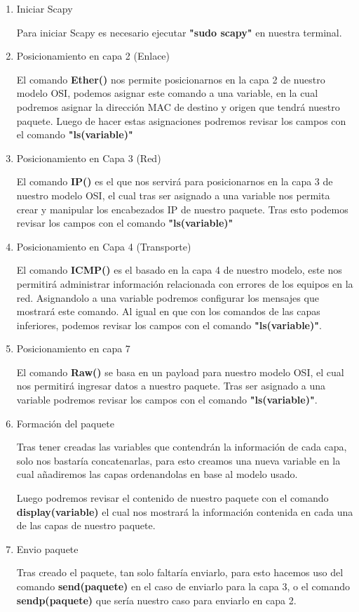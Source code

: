 \documentclass[spanish]{udpreport}
\begin{document}
\begin{enumerate}
	\item Iniciar Scapy
    	\par Para iniciar Scapy es necesario ejecutar \textbf{"sudo scapy"} en nuestra terminal.
    \item Posicionamiento en capa 2 (Enlace)
        \par El comando \textbf{Ether()} nos permite posicionarnos en la capa 2 de nuestro modelo OSI, podemos asignar este comando a una variable, en la cual podremos asignar la dirección MAC de destino y origen que tendrá nuestro paquete. Luego de hacer estas asignaciones podremos revisar los campos con el comando \textbf{"ls(variable)"} 
       \item Posicionamiento en Capa 3 (Red)
       	\par El comando \textbf{IP()} es el que nos servirá para posicionarnos en la capa 3 de nuestro modelo OSI, el cual tras ser asignado a una variable nos permita crear y manipular los encabezados IP de nuestro paquete. Tras esto podemos revisar los campos  con el comando \textbf{"ls(variable)"} 
       \item Posicionamiento en Capa 4 (Transporte)
       	\par El comando \textbf{ICMP()} es el basado en la capa 4 de nuestro modelo, este nos permitirá administrar información relacionada con errores de los equipos en la red. Asignandolo a una variable podremos configurar los mensajes que mostrará este comando. Al igual en que con los comandos de las capas inferiores, podemos revisar los campos con el comando \textbf{"ls(variable)"}.
       \item Posicionamiento en capa 7
       	\par El comando \textbf{Raw()} se basa en un payload para nuestro modelo OSI, el cual nos permitirá ingresar datos a nuestro paquete. Tras ser asignado a una variable podremos revisar los campos con el comando \textbf{"ls(variable)"}.
       \item Formación del paquete
       	\par Tras tener creadas las variables que contendrán la información de cada capa, solo nos bastaría concatenarlas, para esto creamos una nueva variable en la cual añadiremos las capas ordenandolas en base al modelo usado.
        \par Luego podremos revisar el contenido de nuestro paquete con el comando \textbf{display(variable)} el cual nos mostrará la información contenida en cada una de las capas de nuestro paquete.
       \item Envio paquete
       	\par Tras creado el paquete, tan solo faltaría enviarlo, para esto hacemos uso del comando \textbf{send(paquete)} en el caso de enviarlo para la capa 3, o el comando \textbf{sendp(paquete)} que sería nuestro caso para enviarlo en capa 2.
        

\end{enumerate}
\end{document}
